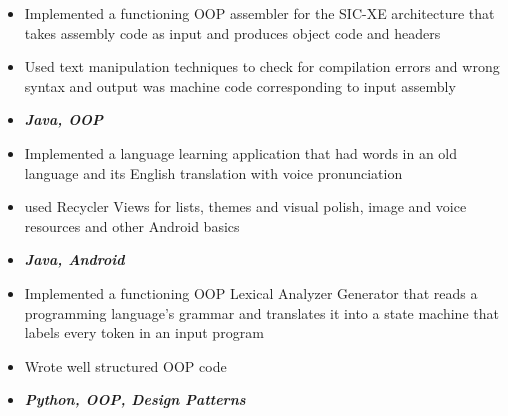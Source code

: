 \documentclass[10pt,a4paper]{altacv}
\begin{document}
\begin{itemize}
\item Implemented a functioning OOP assembler for the SIC-XE architecture that takes assembly code as input and produces object code and headers
\item Used text manipulation techniques to check for compilation errors and wrong syntax  and output was machine code corresponding to input assembly
\item \textit{\textbf{Java, OOP}}
\end{itemize}
\divider
{}
\begin{itemize}
\item Implemented a language learning application that had words in an old language and its English translation with voice pronunciation
\item used Recycler Views for lists, themes and visual polish, image and voice resources and other Android basics
\item \textit{\textbf{Java, Android}}
\end{itemize}
\divider
{}
\begin{itemize}
\item Implemented a functioning OOP Lexical Analyzer Generator that reads a programming language's grammar and translates it into a state machine that labels every token in an input program
\item Wrote well structured OOP code
\item \textit{\textbf{Python, OOP, Design Patterns}}
\end{itemize}
\end{document}
